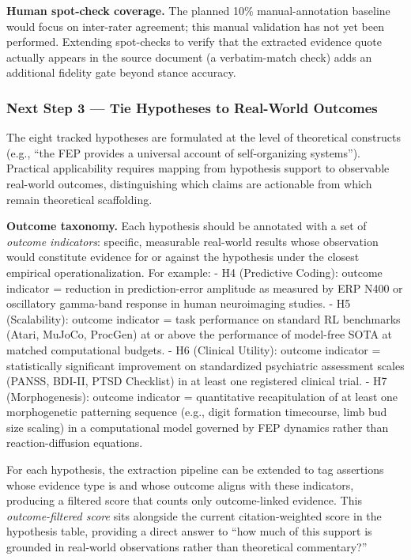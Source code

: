 \documentclass[
  english,
]{article}
\begin{document}
\textbf{Human spot-check coverage.} The planned 10\% manual-annotation
baseline would focus on inter-rater agreement; this manual validation
has not yet been performed. Extending spot-checks to verify that the
extracted evidence quote actually appears in the source document (a
verbatim-match check) adds an additional fidelity gate beyond stance
accuracy.

\subsubsection{Next Step 3 --- Tie Hypotheses to Real-World
Outcomes}\label{next-step-3-tie-hypotheses-to-real-world-outcomes}

The eight tracked hypotheses are formulated at the level of theoretical
constructs (e.g., ``the FEP provides a universal account of
self-organizing systems''). Practical applicability requires mapping
from hypothesis support to observable real-world outcomes,
distinguishing which claims are actionable from which remain theoretical
scaffolding.

\textbf{Outcome taxonomy.} Each hypothesis should be annotated with a
set of \emph{outcome indicators}: specific, measurable real-world
results whose observation would constitute evidence for or against the
hypothesis under the closest empirical operationalization. For example:
- H4 (Predictive Coding): outcome indicator = reduction in
prediction-error amplitude as measured by ERP N400 or oscillatory
gamma-band response in human neuroimaging studies. - H5 (Scalability):
outcome indicator = task performance on standard RL benchmarks (Atari,
MuJoCo, ProcGen) at or above the performance of model-free SOTA at
matched computational budgets. - H6 (Clinical Utility): outcome
indicator = statistically significant improvement on standardized
psychiatric assessment scales (PANSS, BDI-II, PTSD Checklist) in at
least one registered clinical trial. - H7 (Morphogenesis): outcome
indicator = quantitative recapitulation of at least one morphogenetic
patterning sequence (e.g., digit formation timecourse, limb bud size
scaling) in a computational model governed by FEP dynamics rather than
reaction-diffusion equations.

For each hypothesis, the extraction pipeline can be extended to tag
assertions whose evidence type is  and
whose outcome aligns with these indicators, producing a filtered score
that counts only outcome-linked evidence. This \emph{outcome-filtered
score} sits alongside the current citation-weighted score in the
hypothesis table, providing a direct answer to ``how much of this
support is grounded in real-world observations rather than theoretical
commentary?''
\end{document}
